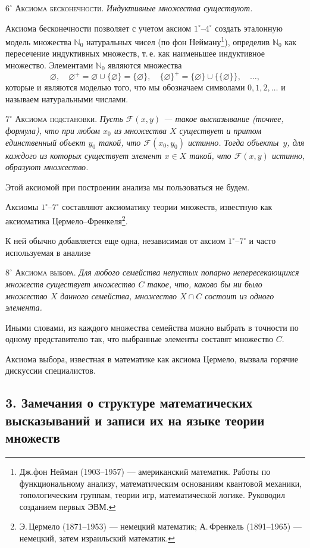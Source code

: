 $6^\circ$ \textsc{Аксиома бесконечности}. \textit{Индуктивные множества существуют.}

Аксиома бесконечности позволяет с учетом аксиом $1^\circ$--$4^\circ$ создать эталонную
модель множества $\mathbb{N}_0$ натуральных чисел (по фон Нейману\footnote{Дж.\;фон Нейман (1903--1957) --- американский математик. Работы по функциональному анализу, математическим основаниям квантовой механики, топологическим группам, теории игр, математической логике. Руководил созданием первых ЭВМ.}), определив $\mathbb{N}_0$ как
пересечение индуктивных множеств, т.\,е. как наименьшее индуктивное множество.
Элементами $\mathbb{N}_0$ являются множества
\[
  \varnothing, \quad \varnothing^+ = \varnothing \cup \{\varnothing\} = \{\varnothing\}, \quad
  \{\varnothing\}^+ = \{\varnothing\} \cup \{\{\varnothing\}\}, \quad \ldots,
\]
которые и являются моделью того, что мы обозначаем символами $0, 1, 2, \ldots$ и
называем натуральными числами.

$7^\circ$ \textsc{Аксиома подстановки}. \textit{Пусть $\mathscr{F}(x, y)$ --- такое высказывание (точнее,
формула), что при любом $x_0$ из множества $X$ существует и притом единственный
объект $y_0$ такой, что $\mathscr{F}(x_0, y_0)$ истинно. Тогда объекты~$y$, для каждого из которых
существует элемент $x \in X$ такой, что $\mathscr{F}(x, y)$ истинно, образуют множество.}

Этой аксиомой при построении анализа мы пользоваться не будем.

Аксиомы $1^\circ$--$7^\circ$ составляют аксиоматику теории множеств, известную как аксиоматика Цермело--Френкеля\footnote{Э.\,Цермело (1871--1953) --- немецкий математик; А.\,Френкель (1891--1965) --- немецкий, затем израильский математик.}.

К ней обычно добавляется еще одна, независимая от аксиом $1^\circ$--$7^\circ$ и часто используемая в анализе

$8^\circ$ \textsc{Аксиома выбора}. \textit{Для любого семейства непустых попарно непересекающихся
множеств существует множество $C$ такое, что, каково бы ни было множество $X$
данного семейства, множество $X \cap C$ состоит из одного элемента.}

Иными словами, из каждого множества семейства можно выбрать в точности по
одному представителю так, что выбранные элементы составят множество $C$.

Аксиома выбора, известная в математике как аксиома Цермело, вызвала горячие
дискуссии специалистов.

\subsection*{3. Замечания о структуре математических высказываний и записи
их на языке теории множеств}

